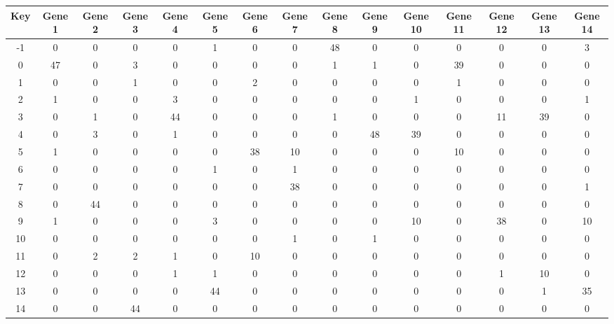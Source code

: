 \begin{tabular}{|c|c|c|c|c|c|c|c|c|c|c|c|c|c|c|}
\hline
Key & Gene 1 & Gene 2 & Gene 3 & Gene 4 & Gene 5 & Gene 6 & Gene 7 & Gene 8 & Gene 9 & Gene 10 & Gene 11 & Gene 12 & Gene 13 & Gene 14 \\
\hline
-1 & 0 & 0 & 0 & 0 & 1 & 0 & 0 & 48 & 0 & 0 & 0 & 0 & 0 & 3 \\
0 & 47 & 0 & 3 & 0 & 0 & 0 & 0 & 1 & 1 & 0 & 39 & 0 & 0 & 0 \\
1 & 0 & 0 & 1 & 0 & 0 & 2 & 0 & 0 & 0 & 0 & 1 & 0 & 0 & 0 \\
2 & 1 & 0 & 0 & 3 & 0 & 0 & 0 & 0 & 0 & 1 & 0 & 0 & 0 & 1 \\
3 & 0 & 1 & 0 & 44 & 0 & 0 & 0 & 1 & 0 & 0 & 0 & 11 & 39 & 0 \\
4 & 0 & 3 & 0 & 1 & 0 & 0 & 0 & 0 & 48 & 39 & 0 & 0 & 0 & 0 \\
5 & 1 & 0 & 0 & 0 & 0 & 38 & 10 & 0 & 0 & 0 & 10 & 0 & 0 & 0 \\
6 & 0 & 0 & 0 & 0 & 1 & 0 & 1 & 0 & 0 & 0 & 0 & 0 & 0 & 0 \\
7 & 0 & 0 & 0 & 0 & 0 & 0 & 38 & 0 & 0 & 0 & 0 & 0 & 0 & 1 \\
8 & 0 & 44 & 0 & 0 & 0 & 0 & 0 & 0 & 0 & 0 & 0 & 0 & 0 & 0 \\
9 & 1 & 0 & 0 & 0 & 3 & 0 & 0 & 0 & 0 & 10 & 0 & 38 & 0 & 10 \\
10 & 0 & 0 & 0 & 0 & 0 & 0 & 1 & 0 & 1 & 0 & 0 & 0 & 0 & 0 \\
11 & 0 & 2 & 2 & 1 & 0 & 10 & 0 & 0 & 0 & 0 & 0 & 0 & 0 & 0 \\
12 & 0 & 0 & 0 & 1 & 1 & 0 & 0 & 0 & 0 & 0 & 0 & 1 & 10 & 0 \\
13 & 0 & 0 & 0 & 0 & 44 & 0 & 0 & 0 & 0 & 0 & 0 & 0 & 1 & 35 \\
14 & 0 & 0 & 44 & 0 & 0 & 0 & 0 & 0 & 0 & 0 & 0 & 0 & 0 & 0 \\
\hline
\end{tabular}